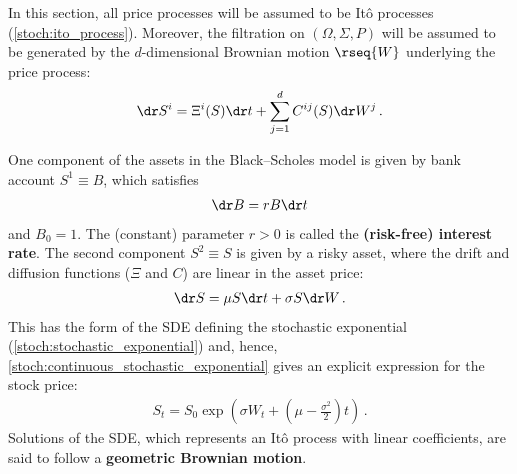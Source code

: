     In this section, all price processes will be assumed to be It\^o processes (\cref{stoch:ito_process}). Moreover, the filtration on $(\Omega,\Sigma,P)$ will be assumed to be generated by the $d$-dimensional Brownian motion $\rseq{W}$ underlying the price process:
    \begin{gather}
        \dr S^i = \Xi^i(S)\dr t + \sum_{j=1}^dC^{ij}(S)\dr W^j\,.
    \end{gather}

    One component of the assets in the Black--Scholes model is given by bank account $S^1\equiv B$, which satisfies
    \begin{gather}
        \dr B = r B\dr t
    \end{gather}
    and $B_0=1$. The (constant) parameter $r>0$ is called the \textbf{(risk-free) interest rate}. The second component $S^2\equiv S$ is given by a risky asset, where the drift and diffusion functions ($\Xi$ and $C$) are linear in the asset price:
    \begin{gather}
        \dr S = \mu S\dr t + \sigma S\dr W\,.
    \end{gather}
    This has the form of the SDE defining the stochastic exponential (\cref{stoch:stochastic_exponential}) and, hence, \cref{stoch:continuous_stochastic_exponential} gives an explicit expression for the stock price:
    \begin{gather}
        S_t = S_0\exp\left(\sigma W_t + \left(\mu-\frac{\sigma^2}{2}\right)t\right)\,.
    \end{gather}
    Solutions of the SDE, which represents an It\^o process with linear coefficients, are said to follow a \textbf{geometric Brownian motion}. 